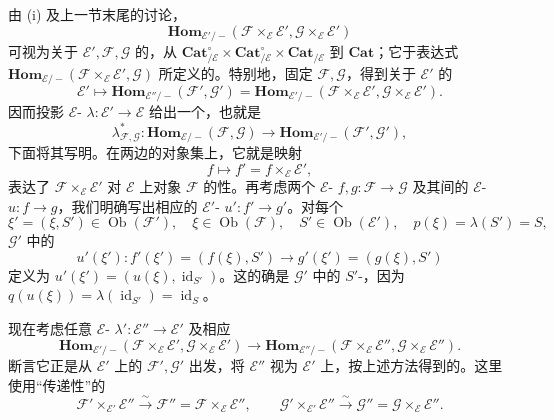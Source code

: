 由 (i) 及上一节末尾的讨论，
\[
 \mathbf{Hom}_{\mathcal E'/-}(\mathcal F\times_{\mathcal E}\mathcal E',\mathcal G\times_{\mathcal E}\mathcal E')
\]
可视为关于 $\mathcal E',\mathcal F,\mathcal G$ 的，从 $\mathbf{Cat}_{/\mathcal E}^{\circ}\times\mathbf{Cat}_{/\mathcal E}^{\circ}\times\mathbf{Cat}_{/\mathcal E}$ 到 $\mathbf{Cat}$；它于表达式 $\mathbf{Hom}_{\mathcal E/-}(\mathcal F\times_{\mathcal E}\mathcal E',\mathcal G)$ 所定义的。特别地，固定 $\mathcal F,\mathcal G$，得到关于 $\mathcal E'$ 的
\[
 \mathcal E'\longmapsto\mathbf{Hom}_{\mathcal E''/-}(\mathcal F',\mathcal G')
 =\mathbf{Hom}_{\mathcal E'/-}(\mathcal F\times_{\mathcal E}\mathcal E',\mathcal G\times_{\mathcal E}\mathcal E').
\]
因而投影 $\mathcal E$- $\lambda:\mathcal E'\to\mathcal E$ 给出一个，也就是
\[
 \lambda^*_{\mathcal F,\mathcal G}:\mathbf{Hom}_{\mathcal E/-}(\mathcal F,\mathcal G)
 \longrightarrow\mathbf{Hom}_{\mathcal E'/-}(\mathcal F',\mathcal G'),
\]
下面将其写明。在两边的对象集上，它就是映射
\[
 f\longmapsto f'=f\times_{\mathcal E}\mathcal E',
\]
表达了 $\mathcal F\times_{\mathcal E}\mathcal E'$ 对 $\mathcal E$ 上对象 $\mathcal F$ 的性。再考虑两个 $\mathcal E$- $f,g:\mathcal F\to\mathcal G$ 及其间的 $\mathcal E$- $u:f\to g$，我们明确写出相应的 $\mathcal E'$- $u':f'\to g'$。对每个
\[
 \xi'=(\xi,S')\in\operatorname{Ob}(\mathcal F'),\quad
 \xi\in\operatorname{Ob}(\mathcal F),\quad S'\in\operatorname{Ob}(\mathcal E'),\quad
 p(\xi)=\lambda(S')=S,
\]
$\mathcal G'$ 中的
\[
 u'(\xi'):f'(\xi')=(f(\xi),S')\longrightarrow g'(\xi')=(g(\xi),S')
\]
定义为 $u'(\xi')=(u(\xi),\operatorname{id}_{S'})$。这的确是 $\mathcal G'$ 中的 $S'$-，因为 $q(u(\xi))=\lambda(\operatorname{id}_{S'})=\operatorname{id}_S$。

现在考虑任意 $\mathcal E$- $\lambda':\mathcal E''\to\mathcal E'$ 及相应
\[
 \mathbf{Hom}_{\mathcal E'/-}(\mathcal F\times_{\mathcal E}\mathcal E',\mathcal G\times_{\mathcal E}\mathcal E')
 \longrightarrow\mathbf{Hom}_{\mathcal E''/-}(\mathcal F\times_{\mathcal E}\mathcal E'',\mathcal G\times_{\mathcal E}\mathcal E'').
\]
断言它正是从 $\mathcal E'$ 上的 $\mathcal F',\mathcal G'$ 出发，将 $\mathcal E''$ 视为 $\mathcal E'$ 上，按上述方法得到的。这里使用“传递性”的
\[
 \mathcal F'\times_{\mathcal E'}\mathcal E''\xrightarrow{\sim}
 \mathcal F''=\mathcal F\times_{\mathcal E}\mathcal E'',\qquad
 \mathcal G'\times_{\mathcal E'}\mathcal E''\xrightarrow{\sim}
 \mathcal G''=\mathcal G\times_{\mathcal E}\mathcal E''.
\]

